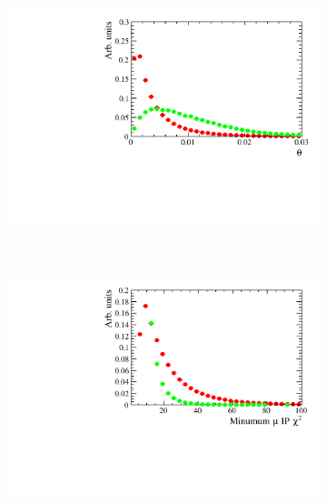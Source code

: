 \begin{figure}
    \begin{subfigure}[b]{0.4\textwidth}
        \includegraphics[width=\textwidth]{./Figs/Selection/var3_sim_all.pdf}
        \caption{ }
        \label{fig:}
    \end{subfigure}
    ~ %
    \begin{subfigure}[b]{0.4\textwidth}
       \includegraphics[width=\textwidth]{./Figs/Selection/var4_sim_all.pdf}
        \caption{ }
        \label{fig:}
    \end{subfigure}


\end{figure}
